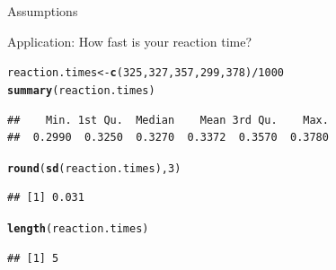 \documentclass[10pt,handout]{beamer}\usepackage[]{graphicx}\usepackage[]{color}
\makeatletter
\newcommand{\hlnum}[1]{\textcolor[rgb]{0.686,0.059,0.569}{#1}}%
\newcommand{\hlopt}[1]{\textcolor[rgb]{0,0,0}{#1}}%
\newcommand{\hlstd}[1]{\textcolor[rgb]{0.345,0.345,0.345}{#1}}%
\newcommand{\hlkwb}[1]{\textcolor[rgb]{0.69,0.353,0.396}{#1}}%
\newcommand{\hlkwd}[1]{\textcolor[rgb]{0.737,0.353,0.396}{\textbf{#1}}}%
\newenvironment{kframe}{%
 \def\at@end@of@kframe{}%
 \ifinner\ifhmode%
  \def\at@end@of@kframe{\end{minipage}}%
  \begin{minipage}{\columnwidth}%
 \fi\fi%
 \def\FrameCommand##1{\hskip\@totalleftmargin \hskip-\fboxsep
 \colorbox{shadecolor}{##1}\hskip-\fboxsep
     \hskip-\linewidth \hskip-\@totalleftmargin \hskip\columnwidth}%
 \MakeFramed {\advance\hsize-\width
   \@totalleftmargin\z@ \linewidth\hsize
   \@setminipage}}%
 {\par\unskip\endMakeFramed%
 \at@end@of@kframe}
\newenvironment{knitrout}{}{} %
\makeatother
\begin{document}
\begin{frame}{Assumptions}
\end{frame}


\begin{frame}[fragile]{Application: How fast is your reaction time?}
\begin{knitrout}\tiny
{}\color{fgcolor}\begin{kframe}
\begin{alltt}
\hlstd{reaction.times} \hlkwb{<-} \hlkwd{c}\hlstd{(}\hlnum{325}\hlstd{,}\hlnum{327}\hlstd{,}\hlnum{357}\hlstd{,}\hlnum{299}\hlstd{,}\hlnum{378}\hlstd{)}\hlopt{/}\hlnum{1000}
\hlkwd{summary}\hlstd{(reaction.times)}
\end{alltt}
\begin{verbatim}
##    Min. 1st Qu.  Median    Mean 3rd Qu.    Max. 
##  0.2990  0.3250  0.3270  0.3372  0.3570  0.3780
\end{verbatim}
\begin{alltt}
\hlkwd{round}\hlstd{(}\hlkwd{sd}\hlstd{(reaction.times),}\hlnum{3}\hlstd{)}
\end{alltt}
\begin{verbatim}
## [1] 0.031
\end{verbatim}
\begin{alltt}
\hlkwd{length}\hlstd{(reaction.times)}
\end{alltt}
\begin{verbatim}
## [1] 5
\end{verbatim}
\end{kframe}
\end{knitrout}
	
\end{frame}
\end{document}
